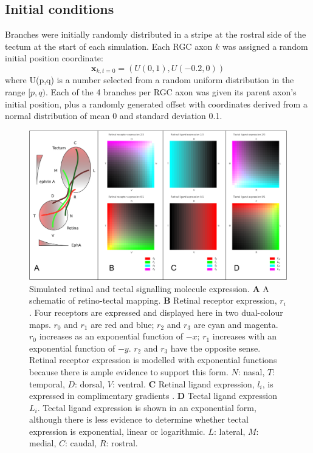 \documentclass[11pt, a4paper]{article}
\begin{document}
\subsection*{Initial conditions}
Branches were initially randomly distributed in a stripe at the rostral side of the tectum at the start of each simulation.
Each RGC axon $k$ was assigned a random initial position coordinate:
\begin{equation}\label{e:ic}
\mathbf{x}_{k,t=0} = (U(0,1), U(-0.2,0))
\end{equation}
where U(p,q) is a number selected from a random uniform distribution in the range $[p,q)$. Each of the 4 branches per RGC axon was given its parent axon's initial position, plus a randomly generated offset with coordinates derived from a normal distribution of mean 0 and standard deviation 0.1.


%
%

\begin{figure}
\includegraphics[width=\linewidth]{./images/expressions_fig.png}
\caption{Simulated retinal and tectal signalling molecule expression.
\textbf{A} A schematic of retino-tectal mapping.
%
\textbf{B} Retinal receptor expression, $r_i$. Four receptors are expressed and displayed here in two dual-colour maps. $r_0$ and $r_1$ are red and blue; $r_2$ and $r_3$ are cyan and magenta. $r_0$ increases as an exponential function of $-x$; $r_1$ increases with an exponential function of $-y$. $r_2$ and $r_3$ have the opposite sense. Retinal receptor expression is modelled with exponential functions because there is ample evidence to support this form. $N$: nasal, $T$: temporal, $D$: dorsal, $V$: ventral.
%
\textbf{C} Retinal ligand expression, $l_i$, is expressed in complimentary gradients \citep{hornberger_modulation_1999}.
%
\textbf{D} Tectal ligand expression $L_i$. Tectal ligand expression is shown in an exponential form, although there is less evidence to determine whether tectal expression is exponential, linear or logarithmic.
$L$: lateral, $M$: medial, $C$: caudal, $R$: rostral.
}
\label{f:ex}
\end{figure}
\end{document}
